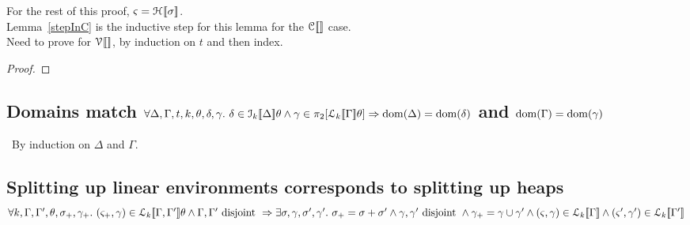 For the rest of this proof, $\varsigma = \mathcal{H}_{} [\![ \sigma ]\!]$.\\
Lemma~\ref{stepInC} is the inductive step for this lemma for the $\mathcal{C}_{} [\![  ]\!]$ case.\\
Need to prove for $\mathcal{V}_{} [\![  ]\!]$, by induction on $t$ and then index.

\begin{proof}








\end{proof}

\subsection{Domains match
\texorpdfstring{$
    \forall \Delta, \Gamma, t, k, \theta, \delta, \gamma.\ %
    \delta \in \den{I}{k}{\Delta}\theta \wedge \gamma \in \pi_2[\den{L}{k}{\Gamma}\theta]
    \Rightarrow \dom(\Delta) = \dom(\delta)$ and $\mathrm{dom}(\Gamma) = \mathrm{dom}(\gamma)
$}{}}\label{samedom}

\pf~By induction on $\Delta$ and $\Gamma$.

\subsection{Splitting up linear environments corresponds to splitting up heaps
\texorpdfstring{$
    \forall k, \Gamma, \Gamma', \theta, \sigma_+, \gamma_+.\ %
    (\varsigma_+, \gamma) \in \den{L}{k}{ \Gamma, \Gamma' }\theta
    \wedge \Gamma, \Gamma' \textrm{ disjoint } \Rightarrow
    \exists \sigma, \gamma, \sigma' , \gamma' .\ \sigma_+ = \sigma + \sigma'
    \wedge \gamma, \gamma' \textrm{ disjoint }
    \wedge \gamma_+ = \gamma \cup \gamma'
    \wedge (\varsigma, \gamma) \in \den{L}{k}{\Gamma}
    \wedge (\varsigma', \gamma') \in \den{L}{k}{\Gamma'}
$}{}}\label{restriction}

